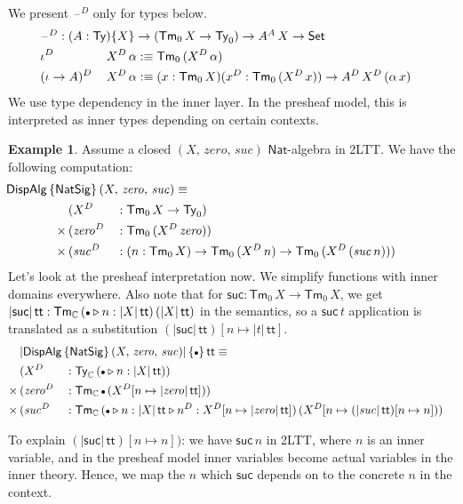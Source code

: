 \documentclass[12pt,a4paper,twoside,openany]{book}
\theoremstyle{remark}
\theoremstyle{definition}
\newtheorem{myexample}{Example}
\theoremstyle{theorem}
\newcommand{\mi}[1]{\mathit{#1}}
\newcommand{\ms}[1]{\mathsf{#1}}
\newcommand{\mbb}[1]{\mathbb{#1}}
\newcommand{\Tm}{\mathsf{Tm}}
\newcommand{\Ty}{\mathsf{Ty}}
\renewcommand{\tt}{\mathsf{tt}}
\newcommand{\blank}{\mathord{\hspace{1pt}\text{--}\hspace{1pt}}}
\newcommand{\Set}{\mathsf{Set}}
\newcommand{\ext}{\triangleright}
\newcommand{\emptycon}{\scaleobj{.75}\bullet}
\newcommand{\DispAlg}{\ms{DispAlg}}
\newcommand{\Nat}{\ms{Nat}}
\newcommand{\mbbC}{\mbb{C}}
\newcommand{\defn}{:\equiv}
\begin{document}
We present $\blank^D$ only for types below.
\begin{alignat*}{3}
  & \rlap{$\blank^D : (A : \Ty)\{X\} \to (\Tm_0\,X \to \Ty_0) \to A^A\,X \to \Set$}\\
  & \iota^D\,       && X^D\,\alpha \defn \Tm_0\,(X^D\,\alpha) \\
  & (\iota\to A)^D\,&& X^D\,\alpha \defn (x : \Tm_0\,X)(x^D : \Tm_0\,(X^D\,x)) \to A^D\,X^D\,(\alpha\,x)
\end{alignat*}
We use type dependency in the inner layer. In the presheaf model, this is
interpreted as inner types depending on certain contexts.
\begin{myexample} Assume a closed $(X,\,\mi{zero},\,\mi{suc})$ $\Nat$-algebra in 2LTT. We have the following computation:
\begin{alignat*}{3}
  & \hspace{-5em}\rlap{$\DispAlg\,\{\ms{NatSig}\}\,(X,\,\mi{zero},\,\mi{suc}) \equiv$}\\
              & (X^D &&: \Tm_0\,X \to \Ty_0)\\
      \times\,& (\mi{zero^D} &&: \Tm_0\,(X^D\,\mi{zero}))\\
      \times\,& (\mi{suc^D} &&: (n : \Tm_0\,X) \to \Tm_0\,(X^D\,n) \to \Tm_0\,(X^D\,(\mi{suc}\,n)))
\end{alignat*}
Let's look at the presheaf interpretation now. We simplify functions with inner
domains everywhere. Also note that for $\ms{suc} : \Tm_0\,X \to \Tm_0\,X$, we
get $|\ms{suc}|\,\tt : \Tm_{\mbbC}\,(\emptycon\ext n : |X|\,\tt)\,(|X|\,\tt)$ in
the semantics, so a $\ms{suc}\,t$ application is translated as a substitution
$(|\ms{suc}|\,\tt)[n \mapsto |t|\,\tt]$.
\begin{alignat*}{3}
  & \rlap{$|\DispAlg\,\{\ms{NatSig}\}\,(X,\,\mi{zero},\,\mi{suc})|\,\{\emptycon\}\,\tt \equiv$}\\
              & (X^D &&: \Ty_{\mbbC}\,(\emptycon\ext n : |X|\,\tt))\\
      \times\,& (\mi{zero^D} &&: \Tm_{\mbbC}\,\emptycon\,(X^D[n \mapsto |\mi{zero}|\,\tt]))\\
      \times\,& (\mi{suc^D} &&: \Tm_{\mbbC}\,(\emptycon\ext n : |X|\,\tt \ext n^D : X^D[n \mapsto |\mi{zero}|\,\tt])\,(X^D[n \mapsto (|\mi{suc}|\,\tt)[n \mapsto n]))
\end{alignat*}
\end{myexample}
To explain $(|\ms{suc}|\,\tt)[n \mapsto n])$: we have $\ms{suc}\,n$ in 2LTT,
where $n$ is an inner variable, and in the presheaf model inner variables become
actual variables in the inner theory. Hence, we map the $n$ which $\ms{suc}$
depends on to the concrete $n$ in the context.
\end{document}
